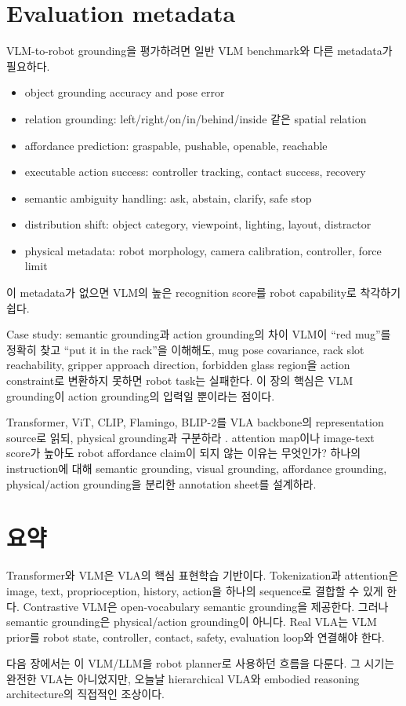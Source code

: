 \section{Evaluation metadata}

VLM-to-robot grounding을 평가하려면 일반 VLM benchmark와 다른 metadata가 필요하다.

\begin{itemize}
  \item object grounding accuracy and pose error
  \item relation grounding: left/right/on/in/behind/inside 같은 spatial relation
  \item affordance prediction: graspable, pushable, openable, reachable
  \item executable action success: controller tracking, contact success, recovery
  \item semantic ambiguity handling: ask, abstain, clarify, safe stop
  \item distribution shift: object category, viewpoint, lighting, layout, distractor
  \item physical metadata: robot morphology, camera calibration, controller, force limit
\end{itemize}

이 metadata가 없으면 VLM의 높은 recognition score를 robot capability로 착각하기 쉽다.

\begin{casebox}{Case study: semantic grounding과 action grounding의 차이}
VLM이 ``red mug''를 정확히 찾고 ``put it in the rack''을 이해해도, mug pose covariance, rack slot reachability, gripper approach direction, forbidden glass region을 action constraint로 변환하지 못하면 robot task는 실패한다. 이 장의 핵심은 VLM grounding이 action grounding의 입력일 뿐이라는 점이다.
\end{casebox}

\chapterwork
{Transformer, ViT, CLIP, Flamingo, BLIP-2를 VLA backbone의 representation source로 읽되, physical grounding과 구분하라 \cite{vaswani2017,dosovitskiy2021vit,clip2021,flamingo2022,blip22023}.}
{attention map이나 image-text score가 높아도 robot affordance claim이 되지 않는 이유는 무엇인가?}
{하나의 instruction에 대해 semantic grounding, visual grounding, affordance grounding, physical/action grounding을 분리한 annotation sheet를 설계하라.}

\section{요약}

Transformer와 VLM은 VLA의 핵심 표현학습 기반이다. Tokenization과 attention은 image, text, proprioception, history, action을 하나의 sequence로 결합할 수 있게 한다. Contrastive VLM은 open-vocabulary semantic grounding을 제공한다. 그러나 semantic grounding은 physical/action grounding이 아니다. Real VLA는 VLM prior를 robot state, controller, contact, safety, evaluation loop와 연결해야 한다.

다음 장에서는 이 VLM/LLM을 robot planner로 사용하던 흐름을 다룬다. 그 시기는 완전한 VLA는 아니었지만, 오늘날 hierarchical VLA와 embodied reasoning architecture의 직접적인 조상이다.

